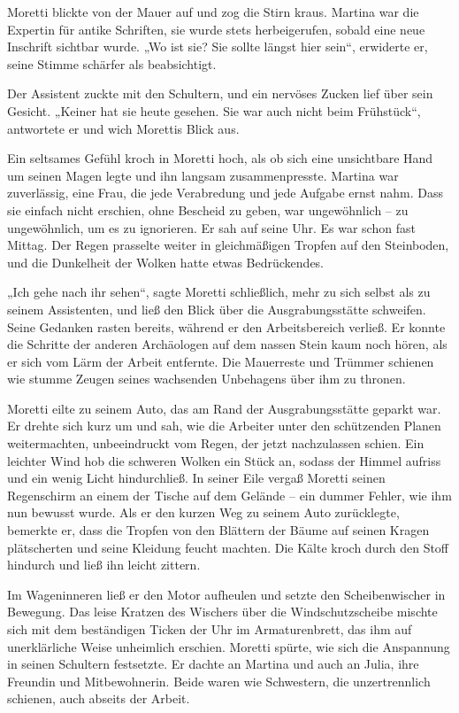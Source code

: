 \documentclass[
]{article}
\begin{document}
Moretti blickte von der Mauer auf und zog die Stirn kraus. Martina war
die Expertin für antike Schriften, sie wurde stets herbeigerufen, sobald
eine neue Inschrift sichtbar wurde. „Wo ist sie? Sie sollte längst hier
sein``, erwiderte er, seine Stimme schärfer als beabsichtigt.

Der Assistent zuckte mit den Schultern, und ein nervöses Zucken lief
über sein Gesicht. „Keiner hat sie heute gesehen. Sie war auch nicht
beim Frühstück``, antwortete er und wich Morettis Blick aus.

Ein seltsames Gefühl kroch in Moretti hoch, als ob sich eine unsichtbare
Hand um seinen Magen legte und ihn langsam zusammenpresste. Martina war
zuverlässig, eine Frau, die jede Verabredung und jede Aufgabe ernst
nahm. Dass sie einfach nicht erschien, ohne Bescheid zu geben, war
ungewöhnlich -- zu ungewöhnlich, um es zu ignorieren. Er sah auf seine
Uhr. Es war schon fast Mittag. Der Regen prasselte weiter in
gleichmäßigen Tropfen auf den Steinboden, und die Dunkelheit der Wolken
hatte etwas Bedrückendes.

„Ich gehe nach ihr sehen``, sagte Moretti schließlich, mehr zu sich
selbst als zu seinem Assistenten, und ließ den Blick über die
Ausgrabungsstätte schweifen. Seine Gedanken rasten bereits, während er
den Arbeitsbereich verließ. Er konnte die Schritte der anderen
Archäologen auf dem nassen Stein kaum noch hören, als er sich vom Lärm
der Arbeit entfernte. Die Mauerreste und Trümmer schienen wie stumme
Zeugen seines wachsenden Unbehagens über ihm zu thronen.

Moretti eilte zu seinem Auto, das am Rand der Ausgrabungsstätte geparkt
war. Er drehte sich kurz um und sah, wie die Arbeiter unter den
schützenden Planen weitermachten, unbeeindruckt vom Regen, der jetzt
nachzulassen schien. Ein leichter Wind hob die schweren Wolken ein Stück
an, sodass der Himmel aufriss und ein wenig Licht hindurchließ. In
seiner Eile vergaß Moretti seinen Regenschirm an einem der Tische auf
dem Gelände -- ein dummer Fehler, wie ihm nun bewusst wurde. Als er den
kurzen Weg zu seinem Auto zurücklegte, bemerkte er, dass die Tropfen von
den Blättern der Bäume auf seinen Kragen plätscherten und seine Kleidung
feucht machten. Die Kälte kroch durch den Stoff hindurch und ließ ihn
leicht zittern.

Im Wageninneren ließ er den Motor aufheulen und setzte den
Scheibenwischer in Bewegung. Das leise Kratzen des Wischers über die
Windschutzscheibe mischte sich mit dem beständigen Ticken der Uhr im
Armaturenbrett, das ihm auf unerklärliche Weise unheimlich erschien.
Moretti spürte, wie sich die Anspannung in seinen Schultern festsetzte.
Er dachte an Martina und auch an Julia, ihre Freundin und Mitbewohnerin.
Beide waren wie Schwestern, die unzertrennlich schienen, auch abseits
der Arbeit.
\end{document}
